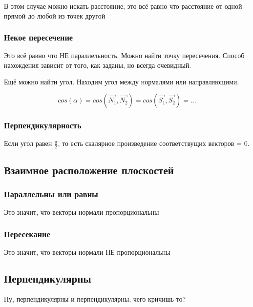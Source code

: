 \documentclass[12pt, a4paper]{article}
\begin{document}
    В этом случае можно искать расстояние, это всё равно что расстояние от одной прямой до любой из точек другой

    \subsubsection{Некое пересечение}
    Это всё равно что НЕ параллельность. Можно найти точку пересечения.
    Способ нахождения зависит от того, как заданы, но всегда очевидный.

    Ещё можно найти угол. Находим угол между нормалями или направляющими.
    
    \begin{equation}
        cos(\alpha) = cos(\vec{N_1}, \vec{N_2}) = cos(\vec{S_1}, \vec{S_2}) = \dots
    \end{equation}

    \begin{note}
        
    \end{note}

    \subsubsection{Перпендикулярность}

    Если угол равен $\frac{\pi}{2}$, то есть скалярное произведение соответствущих векторов = 0.


    \subsection{Взаимное расположение плоскостей}

    \subsubsection{Параллельны или равны}
    Это значит, что векторы нормали пропорциональны
    
    \subsubsection{Пересекание}
    Это значит, что векторы нормали НЕ пропорциональны
    
    \subsection{Перпендикулярны}
    Ну, перпендикулярны и перпендикулярны, чего кричишь-то?
\end{document}
